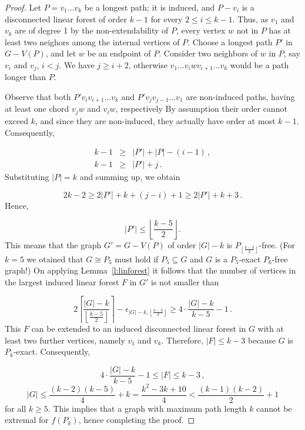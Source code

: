 \documentclass[a4paper,12pt]{article}
\begin{document}
\begin{proof}
	Let $P=v_1\dots v_k$ be a longest path; it is induced, and $P-v_i$ is a disconnected linear forest of order $k-1$ for every $2\leq i\leq k-1$.
	Thus, as $v_1$ and $v_k$ are of degree 1 by the non-extendability of $P$, every vertex $w$ not in $P$ has at least two neighors among the internal vertices of $P$.
	Choose a longest path $P'$ in $G-V(P)$, and let $w$ be an endpoint of $P$.
	Consider two neighbors of $w$ in $P$, say $v_i$ and $v_j$, $i<j$.
	We have $j\geq i+2$, otherwise $v_1\dots v_iwv_{i+1}\dots v_k$ would be a path longer than $P$.
	
	Observe that both $P'v_iv_{i+1}\dots v_k$ and $P'v_jv_{j-1}\dots v_1$ are non-induced paths, having at least one chord $v_jw$ and $v_iw$, respectively
	By assumption their order cannot exceed $k$, and since they are non-induced, they actually have order at most $k-1$.
	Consequently,
	
	\begin{eqnarray}
	 k-1 & \geq & |P'| + |P| - (i-1) \,, \nonumber \\
	 k-1 & \geq & |P'| + j \,. \nonumber
	\end{eqnarray}
	Substituting $|P|=k$ and summing up, we obtain
	
	$$
	  2k-2 \geq 2|P'|+k+(j-i)+1 \geq 2|P'|+k+3 \,.
	$$
	Hence,
	
	$$
	  |P'| \leq \left\lfloor \frac{k-5}{2} \right\rfloor .
	$$
	This means that the graph $G'=G-V(P)$ of order $|G|-k$ is $P_{\left\lfloor \frac{k-3}{2} \right\rfloor}$-free.
	(For $k=5$ we otained that $G\cong P_5$ must hold if $P_5\subseteq G$ and $G$ is a $P_5$-exact $P_6$-free graph!)
	On applying Lemma~\ref{l:linforest} it follows that the number of vertices in the largest induced linear forest $F$ in $G'$ is not smaller than
	
	$$
	  2 \left\lceil \frac{|G|-k}{\left\lfloor \frac{k-5}{2} \right\rfloor} \right\rceil - \epsilon_{|G|-k,\left\lfloor \frac{k-3}{2} \right\rfloor}
	  \geq
	  4 \cdot \frac{|G|-k}{k-5} - 1 \,.
	$$
	This $F$ can be extended to an induced disconnected linear forest in $G$ with at least two further vertices, namely $v_1$ and $v_k$.
	Therefore, $|F|\leq k-3$ because $G$ is $P_k$-exact.
	Consequently,
	
	$$
	  4 \cdot \frac{|G|-k}{k-5} - 1 \leq |F| \leq k-3 \,,
	$$
	$$
	  |G| \leq \frac{(k-2)(k-5)}{4} + k = \frac{k^2 - 3k + 10}{4}
	  <
	  \frac{(k-1)(k-2)}{2} + 1
	$$
	for all $k\geq 5$.
	This implies that a graph with maximum path length $k$ cannot be extremal for $f(P_k)$, hence completing the proof.	
\end{proof}
\end{document}
